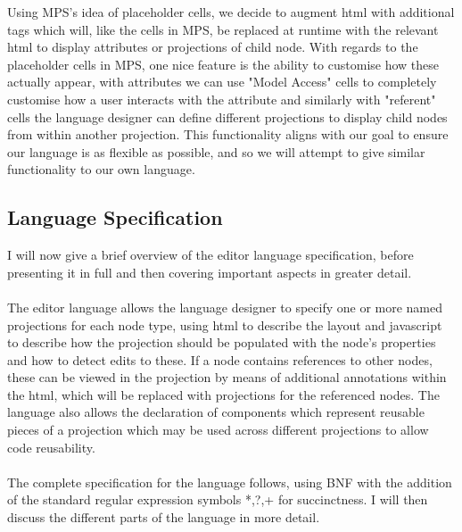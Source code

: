 \documentclass{report}
\begin{document}
Using MPS's idea of placeholder cells, we decide to augment html with additional tags which will, like the cells in MPS, be replaced at runtime with the relevant html to display attributes or projections of child node. With regards to the placeholder cells in MPS, one nice feature is the ability to customise how these actually appear, with attributes we can use "Model Access" cells to completely customise how a user interacts with the attribute and similarly with "referent" cells the language designer can define different projections to display child nodes from within another projection. This functionality aligns with our goal to ensure our language is as flexible as possible, and so we will attempt to give similar functionality to our own language.

\subsection{Language Specification}
I will now give a brief overview of the editor language specification, before presenting it in full and then covering important aspects in greater detail. 
\\
\\
The editor language allows the language designer to specify one or more named projections for each node type, using html to describe the layout and javascript to describe how the projection should be populated with the node's properties and how to detect edits to these. If a node contains references to other nodes, these can be viewed in the projection by means of additional annotations within the html, which will be replaced with projections for the referenced nodes. The language also allows the declaration of components which represent reusable pieces of a projection which may be used across different projections to allow code reusability. 
\\
\\
The complete specification for the language follows, using BNF with the addition of the standard regular expression symbols *,?,+ for succinctness. I will then discuss the different parts of the language in more detail.

\setlength{\grammarparsep}{12pt plus 1pt minus 1pt} %
\setlength{\grammarindent}{5em} %
\end{document}
